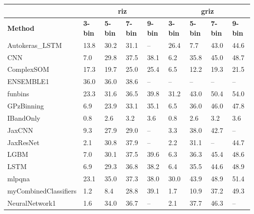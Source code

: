 \documentclass[twocolumn,twocolappendix]{aastex63}
\begin{document}
\begin{table}[]
\begin{tabular}{|l|llll|llll|}
                & \multicolumn{4}{c|}{\textbf{riz}}      & \multicolumn{4}{c|}{\textbf{griz}}                                \\ \hline
\textbf{Method} & \textbf{3-bin} & \textbf{5-bin} & \textbf{7-bin} & \textbf{9-bin} & \textbf{3-bin} & \textbf{5-bin} & \textbf{7-bin} & \textbf{9-bin} \\ \hline
{\sc Autokeras\_LSTM } & 13.8 & 30.2    & 31.1    & --    & 26.4             & 7.7             & 43.0             & 44.6\\
{\sc CNN } & 7.0 & 29.8    & 37.5    & 38.1    & 6.2             & 35.8             & 45.0             & 48.7\\
{\sc ComplexSOM } & 17.3 & 19.7    & 25.0    & 25.4    & 6.5             & 12.2             & 19.3             & 21.5\\
{\sc ENSEMBLE1 } & 36.0 & 36.0    & 38.6    & --    & --             & --             & --             & --\\
{\sc funbins } & 23.3 & 31.6    & 36.5    & 39.8    & 31.2             & 43.0             & 50.4             & 54.0\\
{\sc GPzBinning } & 6.9 & 23.9    & 33.1    & 35.1    & 6.5             & 36.0             & 46.0             & 47.8\\
{\sc IBandOnly } & 0.8 & 2.6    & 3.2    & 3.6    & 0.8             & 2.6             & 3.2             & 3.6\\
{\sc JaxCNN } & 9.3 & 27.9    & 29.0    & --    & 3.3             & 38.0             & 42.7             & --\\
{\sc JaxResNet } & 2.1 & 30.8    & 37.9    & --    & 2.2             & 31.1             & --             & 44.7\\
{\sc LGBM } & 7.0 & 30.1    & 37.5    & 39.6    & 6.3             & 36.3             & 45.4             & 48.6\\
{\sc LSTM } & 6.9 & 29.3    & 36.8    & 38.2    & 6.4             & 35.5             & 44.6             & 48.9\\
{\sc mlpqna } & 23.1 & 35.0    & 37.3    & 38.0    & 30.0             & 43.9             & 48.9             & 51.4\\
{\sc myCombinedClassifiers } & 1.2 & 8.4    & 28.8    & 39.1    & 1.7             & 10.9             & 37.2             & 49.3\\
{\sc NeuralNetwork1 } & 1.6 & 34.0    & 36.7    & --    & 2.1             & 37.7             & 46.3             & --\\

\end{tabular}
\end{table}
\end{document}
